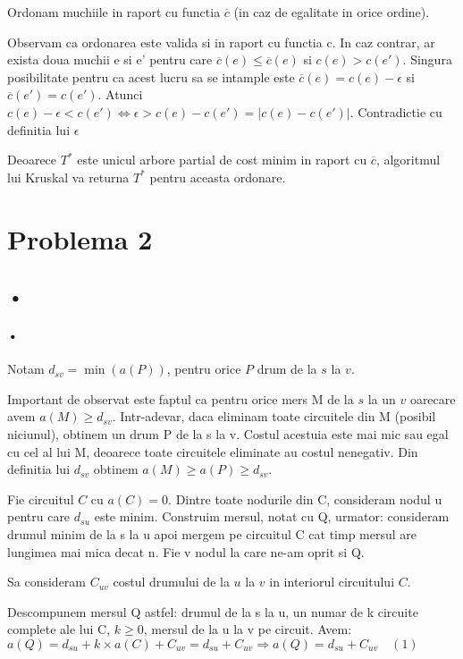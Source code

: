 \documentclass[paper=a4, fontsize=11pt]{scrartcl}
\begin{document}
Ordonam muchiile in raport cu functia $\overline{c}$ (in caz de egalitate in orice ordine).

Observam ca ordonarea este valida si in raport cu functia c. In caz contrar, ar exista doua muchii e si e' pentru care $\overline{c}(e) \leqslant \overline{c}(e)$ si $c(e) > c(e')$. Singura posibilitate pentru ca acest lucru sa se intample este $\overline{c}(e)=c(e)-\epsilon$ si $\overline{c}(e')=c(e')$. Atunci $c(e)-\epsilon <c(e')\iff \epsilon >c(e)-c(e')=\left| c(e)-c(e')\right| $. Contradictie cu definitia lui $\epsilon$

Deoarece $T^*$ este unicul arbore partial de cost minim in raport cu $\overline{c}$, algoritmul lui Kruskal va returna $T^*$ pentru aceasta ordonare.

\newpage
\section{Problema 2}

\subsection{•}
\paragraph{•}
Notam $d_{sv} = \min{(a(P))}$, pentru orice $P$ drum de la $s$ la $v$.

Important de observat este faptul ca pentru orice mers M de la $s$ la un $v$ oarecare avem $a(M) \geqslant d_{sv}$. Intr-adevar, daca eliminam toate circuitele din M (posibil niciunul), obtinem un drum P de la s la v. Costul acestuia este mai mic sau egal cu cel al lui M, deoarece toate circuitele eliminate au costul nenegativ. Din definitia lui $d_{sv}$ obtinem $a(M) \geqslant a(P) \geqslant d_{sv}$.

Fie circuitul $C$ cu $a(C) = 0$. Dintre toate nodurile din C, consideram nodul u pentru care $d_{su}$ este minim. Construim mersul, notat cu Q, urmator: consideram drumul minim de la s la u apoi mergem pe circuitul C cat timp mersul are lungimea mai mica decat n. Fie v nodul la care ne-am oprit si Q.

Sa consideram $C_{uv}$ costul drumului de la $u$ la $v$ in interiorul circuitului $C$.

Descompunem mersul Q astfel: drumul de la s la u, un numar de k circuite complete ale lui C, $k \geqslant 0$, mersul de la u la v pe circuit. Avem: $a(Q)=d_{su} + k \times a(C) + C_{uv} = d_{su} + C_{uv} \Rightarrow a(Q)=d_{su}+C_{uv} \quad (1)$
\end{document}
